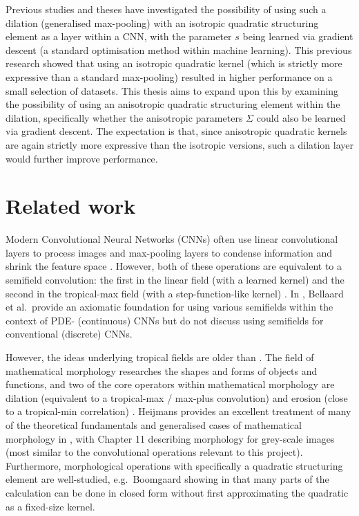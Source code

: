 \documentclass[a4paper, 12pt]{report}
\begin{document}
Previous studies \cite{groenendijk2022morphpool} and theses \cite{thierrybsc, koenbsc} have investigated the possibility of using such a dilation (generalised max-pooling) with an isotropic quadratic structuring element as a layer within a CNN, with the parameter $s$ being learned via gradient descent (a standard optimisation method within machine learning). This previous research showed that using an isotropic quadratic kernel (which is strictly more expressive than a standard max-pooling) resulted in higher performance on a small selection of datasets. This thesis aims to expand upon this by examining the possibility of using an anisotropic quadratic structuring element within the dilation, specifically whether the anisotropic parameters $\Sigma$ could also be learned via gradient descent. The expectation is that, since anisotropic quadratic kernels are again strictly more expressive than the isotropic versions, such a dilation layer would further improve performance.

\newpage
\section{Related work}
Modern Convolutional Neural Networks (CNNs) often use linear convolutional layers to process images and max-pooling layers to condense information and shrink the feature space \cite{introconvnets}. However, both of these operations are equivalent to a semifield convolution: the first in the linear field (with a learned kernel) and the second in the tropical-max field (with a step-function-like kernel) \cite{bellaardaxiomatic}. In \cite{bellaardaxiomatic}, Bellaard et al.\ provide an axiomatic foundation for using various semifields within the context of PDE- (continuous) CNNs but do not discuss using semifields for conventional (discrete) CNNs. 

However, the ideas underlying tropical fields are older than \cite{bellaardaxiomatic}. The field of mathematical morphology researches the shapes and forms of objects and functions, and two of the core operators within mathematical morphology are dilation (equivalent to a tropical-max / max-plus convolution) and erosion (close to a tropical-min correlation) \cite{maragos}. Heijmans provides an excellent treatment of many of the theoretical fundamentals and generalised cases of mathematical morphology in \cite{heijmans1996morphological}, with Chapter 11 describing morphology for grey-scale images (most similar to the convolutional operations relevant to this project). Furthermore, morphological operations with specifically a quadratic structuring element are well-studied, e.g.\ Boomgaard showing in \cite{Boomgaard1999NumericalSS} that many parts of the calculation can be done in closed form without first approximating the quadratic as a fixed-size kernel.
\end{document}
